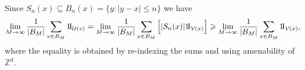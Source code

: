 \documentclass{article}
\newcommand{\Z}{\mathbb{Z}}
\newcommand{\I}{1\!{\rm I}}
\begin{document}
Since $S_n(x)\subseteq B_n(x)=\big\{y:|y-x|\leqslant n\big\}$ we have
\[
 \lim_{M\to\infty} \frac1{|B_M|} \sum_{v\in B_M} \I_{\mathcal
  U(v)} =
 \lim_{M\to\infty} \frac1{|B_M|} \sum_{x\in B_M} \Big[ |S_n(x)| \I_{
\mathcal
                   V(x)} \Big]
 \geqslant \lim_{M\to\infty} \frac{1}{|B_M|} \sum_{x\in B_M} \I_{\mathcal V(x)},
\]
where the equality is obtained by re-indexing the sums and using amenability of
$\Z^d$.
\end{document}
